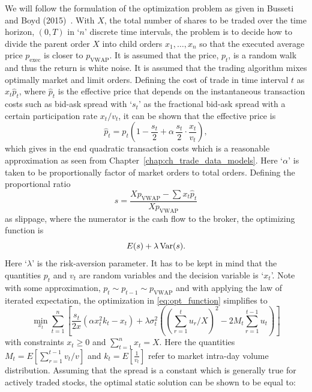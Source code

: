 We will follow the formulation of the optimization problem as given in Busseti and Boyd (2015)~\cite{busseti_boyd}. With $X$, the total number of shares to be traded over the time horizon, $(0,T)$ in `$n$' discrete time intervals, the problem is to decide how to divide the parent order $X$ into child orders $x_1, \ldots, x_n$ so that the executed average price $p_{\text{exec}}$ is closer to $p_{\text{VWAP}}$. It is assumed that the price, $p_t$, is a random walk and thus the return is white noise. It is assumed that the trading algorithm mixes optimally market and limit orders. Defining the cost of trade in time interval $t$ as $x_t \hat{p}_t$, where $\hat{p}_t$ is the effective price that depends on the instantaneous transaction costs such as bid-ask spread with `$s_t$' as the fractional bid-ask spread with a certain participation rate $x_t/v_t$, it can be shown that the effective price is
	\begin{equation}
	\hat{p}_t= p_t \left(1 - \dfrac{s_t}{2} + \alpha \, \dfrac{s_t}{2} \cdot \dfrac{x_t}{v_t} \right),
	\end{equation}
which gives in the end quadratic transaction costs which is a reasonable approximation as seen from Chapter~\ref{chap:ch_trade_data_models}. Here `$\alpha$' is taken to be proportionally factor of market orders to total orders. Defining the proportional ratio
	\begin{equation}
	s= \dfrac{X p_{\text{VWAP}} - \sum x_t \hat{p}_t}{X p_{\text{VWAP}}}
	\end{equation}
as slippage, where the numerator is the cash flow to the broker, the optimizing function is
	\begin{equation} \label{eq:opt_function}
	E(s) + \lambda \var(s).
	\end{equation}
Here `$\lambda$' is the risk-aversion parameter. It has to be kept in mind that the quantities $p_t$ and $v_t$ are random variables and the decision variable is `$x_t$'. Note with some approximation, $p_t \sim p_{t-1} \sim p_{\text{VWAP}}$ and with applying the law of iterated expectation, the optimization in \eqref{eq:opt_function} simplifies to
	\begin{equation}
	\min_{x_t} \sum_{t=1}^n \left[ \dfrac{s_t}{2x} (\alpha x_t^2 k_t - x_t) + \lambda \sigma_t^2 \left( \left( \sum_{r=1}^t u_r/X \right)^2 - 2 M_t \sum_{r=1}^{t-1} u_t \right) \right]
	\end{equation}
with constraints $x_t \geq 0$ and $\sum_{t=1}^n x_t = X$. Here the quantities $M_t= E \left[ \sum_{r=1}^{t-1} v_t/v\right]$ and $k_t= E[\frac{1}{v_t}]$ refer to market intra-day volume distribution. Assuming that the spread is a constant which is generally true for actively traded stocks, the optimal static solution can be shown to be equal to:
